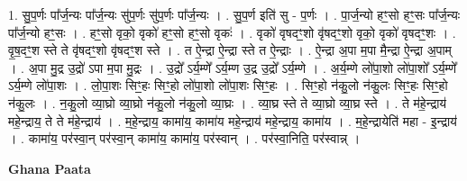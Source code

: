 \documentclass[17pt]{extarticle}
\begin{document}
1. सु॒प॒र्णः पा᳚र्ज॒न्यः पा᳚र्ज॒न्यः सु॑प॒र्णः सु॑प॒र्णः पा᳚र्ज॒न्यः । . सु॒प॒र्ण इति॑ सु - प॒र्णः । . पा॒र्ज॒न्यो हꣳ॒॒सो हꣳ॒॒सः पा᳚र्ज॒न्यः पा᳚र्ज॒न्यो हꣳ॒॒सः । . हꣳ॒॒सो वृको॒ वृको॑ हꣳ॒॒सो हꣳ॒॒सो वृकः॑ । . वृको॑ वृषदꣳ॒॒शो वृ॑षदꣳ॒॒शो वृको॒ वृको॑ वृषदꣳ॒॒शः । . वृ॒ष॒दꣳ॒॒श स्ते ते वृ॑षदꣳ॒॒शो वृ॑षदꣳ॒॒श स्ते । . त ऐ॒न्द्रा ऐ॒न्द्रा स्ते त ऐ॒न्द्राः । . ऐ॒न्द्रा अ॒पा म॒पा मै॒न्द्रा ऐ॒न्द्रा अ॒पाम् । . अ॒पा मु॒द्र उ॒द्रो॑ ऽपा म॒पा मु॒द्रः । . उ॒द्रो᳚ ऽर्य॒म्णे᳚ ऽर्य॒म्ण उ॒द्र उ॒द्रो᳚ ऽर्य॒म्णे । . अ॒र्य॒म्णे लो॑पा॒शो लो॑पा॒शो᳚ ऽर्य॒म्णे᳚ ऽर्य॒म्णे लो॑पा॒शः । . लो॒पा॒शः सिꣳ॒॒हः सिꣳ॒॒हो लो॑पा॒शो लो॑पा॒शः सिꣳ॒॒हः । . सिꣳ॒॒हो न॑कु॒लो न॑कु॒लः सिꣳ॒॒हः सिꣳ॒॒हो न॑कु॒लः । . न॒कु॒लो व्या॒घ्रो व्या॒घ्रो न॑कु॒लो न॑कु॒लो व्या॒घ्रः । . व्या॒घ्र स्ते ते व्या॒घ्रो व्या॒घ्र स्ते । . ते म॑हे॒न्द्राय॑ महे॒न्द्राय॒ ते ते म॑हे॒न्द्राय॑ । . म॒हे॒न्द्राय॒ कामा॑य॒ कामा॑य महे॒न्द्राय॑ महे॒न्द्राय॒ कामा॑य । . म॒हे॒न्द्रायेति॑ महा - इ॒न्द्राय॑ । . कामा॑य॒ पर॑स्वा॒न् पर॑स्वा॒न् कामा॑य॒ कामा॑य॒ पर॑स्वान् । . पर॑स्वा॒निति॒ पर॑स्वान्न् । \newline

\textbf{Ghana Paata } \newline
\end{document}
